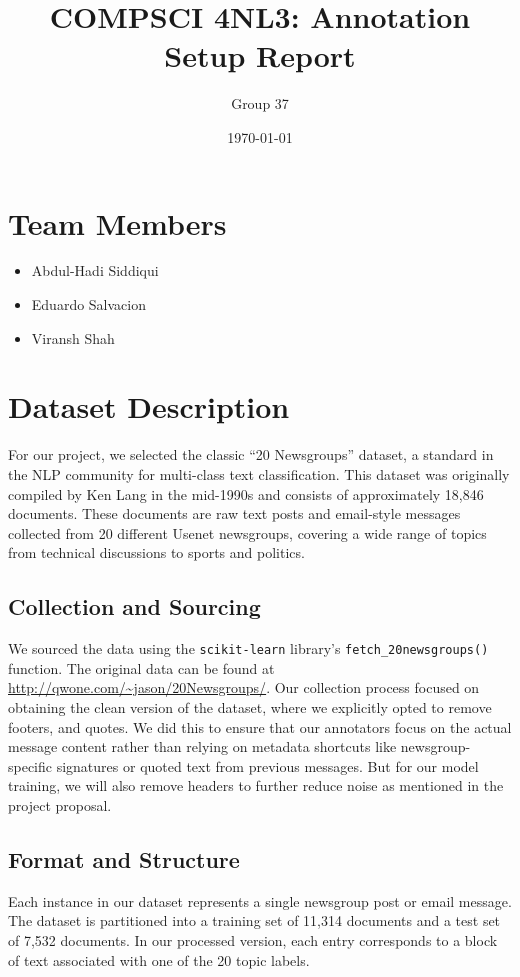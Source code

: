 \documentclass{article}
\title{COMPSCI 4NL3: Annotation Setup Report}
\author{Group 37}
\date{\today}
\begin{document}
\maketitle

\section{Team Members}
\begin{itemize}
    \item Abdul-Hadi Siddiqui
    \item Eduardo Salvacion
    \item Viransh Shah
\end{itemize}

\section{Dataset Description}
For our project, we selected the classic ``20 Newsgroups'' dataset, a standard in the NLP community for multi-class text classification. This dataset was originally compiled by Ken Lang in the mid-1990s and consists of approximately 18,846 documents. These documents are raw text posts and email-style messages collected from 20 different Usenet newsgroups, covering a wide range of topics from technical discussions to sports and politics.

\subsection{Collection and Sourcing}
We sourced the data using the \texttt{scikit-learn} library's \texttt{fetch\_20newsgroups()} function. The original data can be found at \url{http://qwone.com/~jason/20Newsgroups/}. Our collection process focused on obtaining the clean version of the dataset, where we explicitly opted to remove footers, and quotes. We did this to ensure that our annotators focus on the actual message content rather than relying on metadata shortcuts like newsgroup-specific signatures or quoted text from previous messages. But for our model training, we will also remove headers to further reduce noise as mentioned in the project proposal.

\subsection{Format and Structure}
Each instance in our dataset represents a single newsgroup post or email message. The dataset is partitioned into a training set of 11,314 documents and a test set of 7,532 documents. In our processed version, each entry corresponds to a block of text associated with one of the 20 topic labels. 
\end{document}
